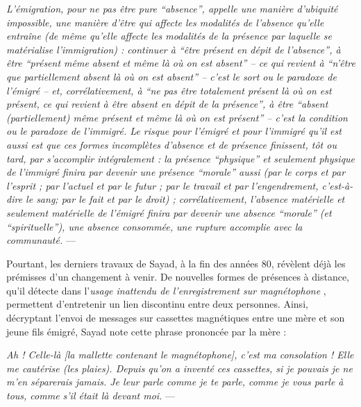 \documentclass[symmetric,justified,marginals=raggedouter]{tufte-book}
\begin{document}
\begin{fullwidth}
\og\textit{L'émigration, pour ne pas être pure  “absence”, appelle une manière d'ubiquité impossible, une manière d'être qui affecte les modalités de l'absence qu'elle entraîne (de même qu'elle affecte les modalités de la présence par laquelle se matérialise l'immigration) : continuer à  “être présent en dépit de l'absence”, à être  “présent même absent et même là où on est absent” -- ce qui revient à  “n'être que partiellement absent là où on est absent” -- c'est le sort ou le paradoxe de l'émigré -- et, corrélativement, à  “ne pas être totalement présent là où on est présent, ce qui revient à être absent en dépit de la présence”, à être “absent (partiellement) même présent et même là  où on est présent” -- c'est la condition ou le paradoxe de l'immigré. Le risque pour l'émigré et pour l'immigré qu'il est aussi est  que  ces  formes  incomplètes  d'absence  et  de  présence  finissent,  tôt  ou  tard,  par  s'accomplir intégralement : la présence  “physique” et seulement physique de l'immigré finira par devenir une présence  “morale” aussi (par le corps et par l'esprit ; par l'actuel et par le futur ; par le travail et par l'engendrement, c'est-à-dire le sang; par le fait et par le droit) ; corrélativement, l'absence matérielle et seulement matérielle de l'émigré finira par devenir une absence  “morale” (et  “spirituelle”), une absence consommée, une rupture accomplie avec la communauté.}\fg{} --- \citep[p.225-226]{sayad_double_2000}\\
\end{fullwidth}

\noindent Pourtant, les derniers travaux de Sayad, à la fin des années 80, révèlent déjà les prémisses d'un changement à venir. De nouvelles formes de présences à distance, qu'il détecte dans l'\og\textit{usage inattendu de l'enre\-gistrement sur magnétophone}\fg{}  \citep{sayad_du_1985}, permettent d'entretenir un lien discontinu entre deux personnes. Ainsi, décryptant l'envoi de messages sur cassettes magnétiques entre une mère et son jeune fils émigré, Sayad note cette phrase prononcée par la mère :\\

\begin{fullwidth}
\og\textit{Ah ! Celle-là [la mallette contenant le magnétophone], c'est ma consolation ! Elle me cautérise (les plaies). Depuis qu'on a inventé ces cassettes, si je pouvais je ne m'en séparerais jamais. Je leur parle comme je te parle, comme je vous parle à tous, comme s'il était là devant moi.}\fg{} --- \citep[p.12]{sayad_du_1985}\\
\end{fullwidth}
\end{document}
